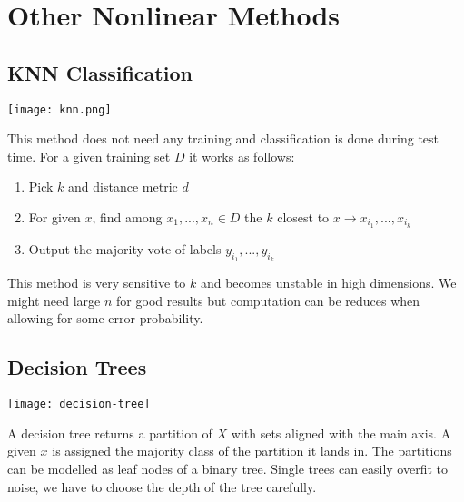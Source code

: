 \section{Other Nonlinear Methods}

\subsection{KNN Classification}

\begin{center}
	\texttt{[image: knn.png]}
\end{center}

This method does not need any training and classification is done during test time. For a given training set $D$ it works as follows:
\begin{enumerate}
	\item Pick $k$ and distance metric $d$
	\item For given $x$, find among $x_1,...,x_n \in D$ the $k$ closest to $x \to x_{i_1},..., x_{i_k}$
	\item Output the majority vote of labels $y_{i_1},..., y_{i_k}$
\end{enumerate}

This method is very sensitive to $k$ and becomes unstable in high dimensions. We might need large $n$ for good results but computation can be reduces when allowing for some error probability.

\subsection{Decision Trees}

\begin{center}
	\texttt{[image: decision-tree]}
\end{center}

A decision tree returns a partition of $X$ with sets aligned with the main axis. A given $x$ is assigned the majority class of the partition it lands in. The partitions can be modelled as leaf nodes of a binary tree. Single trees can easily overfit to noise, we have to choose the depth of the tree carefully.
